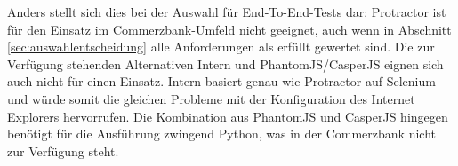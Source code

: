 Anders stellt sich dies bei der Auswahl für End-To-End-Tests dar: Protractor ist für den Einsatz im Commerzbank-Umfeld nicht geeignet, auch wenn in Abschnitt \ref{sec:auswahlentscheidung} alle Anforderungen als erfüllt gewertet sind. Die zur Verfügung stehenden Alternativen Intern und PhantomJS/CasperJS eignen sich auch nicht für einen Einsatz. Intern basiert genau wie Protractor auf Selenium und würde somit die gleichen Probleme mit der Konfiguration des Internet Explorers hervorrufen. Die Kombination aus PhantomJS und CasperJS hingegen benötigt für die Ausführung zwingend Python, was in der Commerzbank nicht zur Verfügung steht.